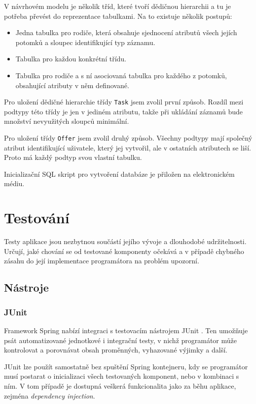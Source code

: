 \documentclass[thesis=B,czech]{FITthesis}[2012/06/26]
\begin{document}
		V návrhovém modelu je několik tříd, které tvoří dědičnou hierarchii a tu je potřeba převést do reprezentace tabulkami. Na to existuje několik postupů:
		\begin{itemize}
			\item Jedna tabulka pro rodiče, která obsahuje sjednocení atributů všech jejích potomků a sloupec identifikující typ záznamu.
			\item Tabulka pro každou konkrétní třídu.
			\item Tabulka pro rodiče a s ní asociovaná tabulka pro každého z potomků, obsahující atributy v něm definované.
		\end{itemize}
		
		Pro uložení dědičné hierarchie třídy \texttt{Task} jsem zvolil první způsob. Rozdíl mezi podtypy této třídy je jen v jediném atributu, takže při ukládání záznamů bude množství nevyužitých sloupců minimální.
		
		Pro uložení třídy \texttt{Offer} jsem zvolil druhý způsob. Všechny podtypy mají společný atribut identifikující uživatele, který jej vytvořil, ale v ostatních atributech se liší. Proto má každý podtyp svou vlastní tabulku.
		
		Inicializační SQL skript pro vytvoření databáze je přiložen na elektronickém médiu.
	
	\section{Testování}
		\label{sec:testing-theory}
		Testy aplikace jsou nezbytnou součástí jejího vývoje a dlouhodobé udržitelnosti. Určují, jaké chování se od testované komponenty očekává a v případě chybného zásahu do její implementace programátora na problém upozorní. 
		
		\subsection{Nástroje}
			\subsubsection{JUnit}
			Framework Spring nabízí integraci s testovacím nástrojem JUnit \cite{junit}. Ten umožňuje psát automatizované jednotkové i integrační testy, v nichž programátor může kontrolovat a porovnávat obsah proměnných, vyhazované výjimky a další.
			
			JUnit lze použít samostatně bez spuštění Spring kontejneru, kdy se programátor musí postarat o inicializaci všech testovaných komponent, nebo v kombinaci s ním. V tom případě je dostupná veškerá funkcionalita jako za běhu aplikace, zejména \textit{dependency injection}.
			
\end{document}
